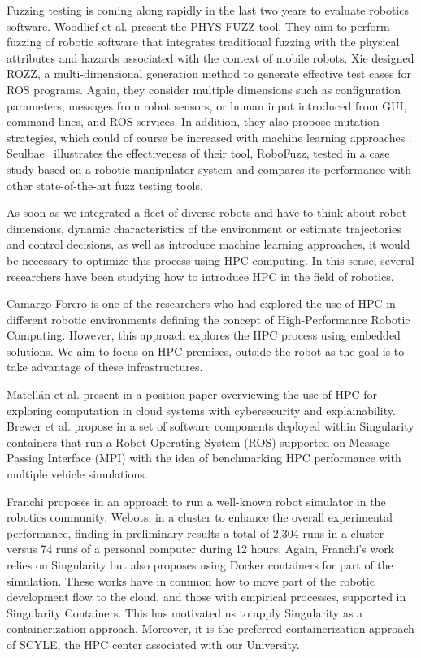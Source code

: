 \documentclass{svproc}
\begin{document}
Fuzzing testing is coming along rapidly in the last two years to evaluate robotics software. Woodlief et al. \cite{woodlief2021fuzzing} present the PHYS-FUZZ tool. They aim to perform fuzzing of robotic software that integrates traditional fuzzing with the physical attributes and hazards associated with the context of mobile robots. 
Xie \cite{xie2022rozz} designed ROZZ, a multi-dimensional generation method to generate effective test cases for ROS programs. Again, they consider multiple dimensions such as configuration parameters, messages from robot sensors, or human input introduced from GUI, command lines, and ROS services. In addition, they also propose mutation strategies, which could of course be increased with machine learning approaches \cite{wang2020systematic}.  Seulbae~\cite{Seulbae:2022} illustrates the effectiveness of their tool, RoboFuzz, tested in a case study based on a robotic manipulator system and compares its performance with other state-of-the-art fuzz testing tools.

As soon as we integrated a fleet of diverse robots and have to think about robot dimensions, dynamic characteristics of the environment or estimate trajectories and control decisions, as well as introduce machine learning approaches, it would be necessary to optimize this process using HPC computing. In this sense, several researchers have been studying how to introduce HPC in the field of robotics. 

Camargo-Forero is one of the researchers who had explored the use of HPC in different robotic environments defining the concept of High-Performance Robotic Computing\cite{CAMARGOFORERO2018167}. However, this approach explores the HPC process using embedded solutions. We aim to focus on HPC premises, outside the robot as the goal is to take advantage of these infrastructures. 

Matellán et al. present in \cite{matellan2021role} a position paper overviewing the use of  HPC for exploring computation in cloud systems with cybersecurity and explainability. 
Brewer et al. propose in \cite{brewer2022scalable} a set of software components deployed within Singularity containers that run a Robot Operating System (ROS) supported on Message Passing Interface (MPI) with the idea of benchmarking HPC performance with multiple vehicle simulations. 

Franchi proposes in \cite{franchi2021webots,franchi2022webots} an approach to run a well-known robot simulator in the robotics community, Webots, in a cluster to enhance the overall experimental performance, finding in preliminary results a total of 2,304 runs in a cluster versus 74 runs of a personal computer during 12 hours. Again, Franchi's work relies on Singularity but also proposes using Docker containers for part of the simulation. These works have in common how to move part of the robotic development flow to the cloud, and those with empirical processes, supported in Singularity Containers. This has motivated us to apply Singularity\cite{kurtzer2017singularity} as a containerization approach. Moreover, it is the preferred containerization approach of SCYLE, the HPC center associated with our University.
\end{document}
